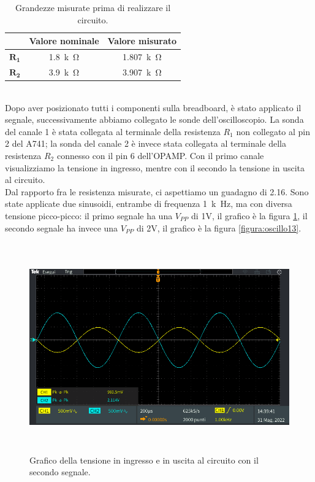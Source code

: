 \documentclass{report}
\begin{document}
\begin{table}[h]
	\centering
	\begin{tabular}{|c|c|c|}
	\cline{2-3} 
	\multicolumn{1}{c|}{} & \textbf{Valore nominale} & \textbf{Valore misurato}\\ 
		\hline
		$\mathbf{R_1}$& \SI{1.8}{k\ohm} & \SI{1.807}{k\ohm} \\ 
		\hline
		$\mathbf{R_2}$& \SI{3.9}{k\ohm} & \SI{3.907}{k\ohm} \\ 
		\hline
	\end{tabular}
\caption{Grandezze misurate prima di realizzare il circuito.}
\label{table:amplinv_comp}
\end{table}
\\Dopo aver posizionato tutti i componenti sulla breadboard, è stato applicato il segnale, successivamente abbiamo collegato le sonde dell'oscilloscopio. La sonda del canale 1 è stata collegata al terminale della resistenza $R_1$ non collegato al pin 2 del \textmu A741; la sonda del canale 2 è invece stata collegata al terminale della resistenza $R_2$ connesso con il pin 6 dell'OPAMP. Con il primo canale visualizziamo la tensione in ingresso, mentre con il secondo la tensione in uscita al circuito. 
\\\indent Dal rapporto fra le resistenza misurate, ci aspettiamo un guadagno di 2.16. Sono state applicate due sinusoidi, entrambe di frequenza \SI{1}{k\hertz}, ma con diversa tensione picco-picco: il primo segnale ha una $V_{PP}$ di 1V, il grafico è la figura \ref{figura:oscillo12}, il secondo segnale ha invece una $V_{PP}$ di 2V, il grafico è la figura \ref{figura:oscillo13}.
\begin{figure}[h]
\centering
\includegraphics[height=9cm]{immagini/oscillo12}
\caption{Grafico della tensione in ingresso e in uscita al circuito con il secondo segnale.}
\label{figura:oscillo12}
\end{figure}
\end{document}
